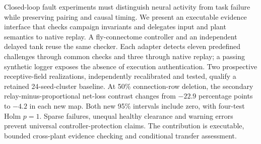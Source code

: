 Closed-loop fault experiments must distinguish neural activity from task failure while preserving pairing and causal timing. We present an executable evidence interface that checks campaign invariants and delegates input and plant semantics to native replay. A fly-connectome controller and an independent delayed tank reuse the same checker. Each adapter detects eleven predefined challenges through common checks and three through native replay; a passing synthetic logger exposes the absence of execution authentication. Two prospective receptive-field realizations, independently recalibrated and tested, qualify a retained 24-seed-cluster baseline. At 50\% connection-row deletion, the secondary relay-minus-proportional net-loss contrast changes from $-22.9$ percentage points to $-4.2$ in each new map. Both new 95\% intervals include zero, with four-test Holm $p=1$. Sparse failures, unequal healthy clearance and warning errors prevent universal controller-protection claims. The contribution is executable, bounded cross-plant evidence checking and conditional transfer assessment.
